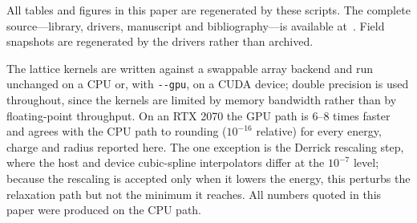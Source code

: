 \documentclass[aps,prd,preprint,nofootinbib,longbibliography]{revtex4-2}
\begin{document}
All tables and figures in this paper are regenerated by these scripts. The
complete source---library, drivers, manuscript and bibliography---is available
at~\cite{repo}. Field snapshots are regenerated by the drivers rather than
archived.

The lattice kernels are written against a swappable array backend and run
unchanged on a CPU or, with \texttt{-{}-gpu}, on a CUDA device; double precision
is used throughout, since the kernels are limited by memory bandwidth rather than
by floating-point throughput. On an RTX 2070 the GPU path is $6$--$8$ times
faster and agrees with the CPU path to rounding ($10^{-16}$ relative) for every
energy, charge and radius reported here. The one exception is the Derrick
rescaling step, where the host and device cubic-spline interpolators differ at
the $10^{-7}$ level; because the rescaling is accepted only when it lowers the
energy, this perturbs the relaxation path but not the minimum it reaches. All
numbers quoted in this paper were produced on the CPU path.



\end{document}
